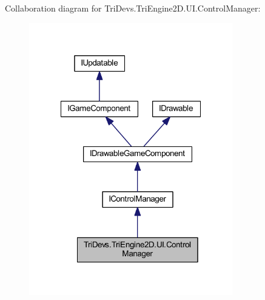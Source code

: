 Collaboration diagram for Tri\-Devs.\-Tri\-Engine2\-D.\-U\-I.\-Control\-Manager\-:
\nopagebreak
\begin{figure}[H]
\begin{center}
\leavevmode
\includegraphics[width=251pt]{class_tri_devs_1_1_tri_engine2_d_1_1_u_i_1_1_control_manager__coll__graph}
\end{center}
\end{figure}
